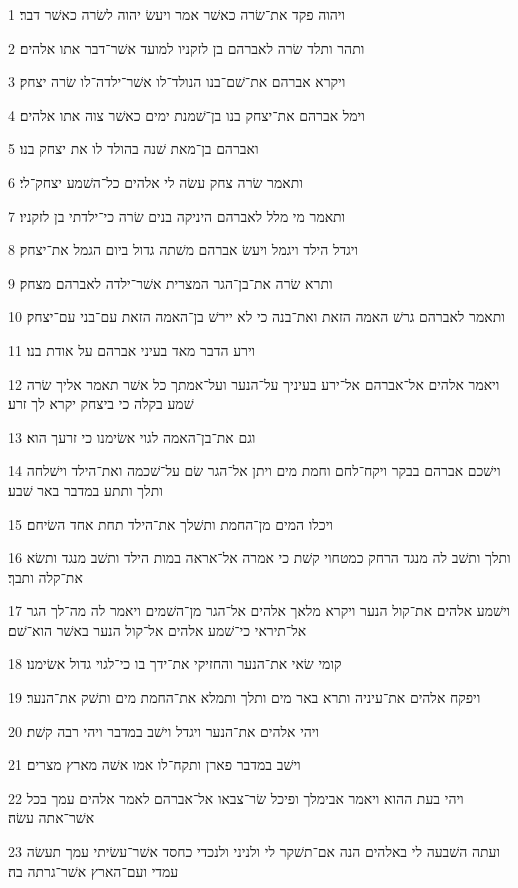 \par 1 ויהוה פקד את־שׂרה כאשׁר אמר ויעשׂ יהוה לשׂרה כאשׁר דבר׃
\par 2 ותהר ותלד שׂרה לאברהם בן לזקניו למועד אשׁר־דבר אתו אלהים׃
\par 3 ויקרא אברהם את־שׁם־בנו הנולד־לו אשׁר־ילדה־לו שׂרה יצחק׃
\par 4 וימל אברהם את־יצחק בנו בן־שׁמנת ימים כאשׁר צוה אתו אלהים׃
\par 5 ואברהם בן־מאת שׁנה בהולד לו את יצחק בנו׃
\par 6 ותאמר שׂרה צחק עשׂה לי אלהים כל־השׁמע יצחק־לי׃
\par 7 ותאמר מי מלל לאברהם היניקה בנים שׂרה כי־ילדתי בן לזקניו׃
\par 8 ויגדל הילד ויגמל ויעשׂ אברהם משׁתה גדול ביום הגמל את־יצחק׃
\par 9 ותרא שׂרה את־בן־הגר המצרית אשׁר־ילדה לאברהם מצחק׃
\par 10 ותאמר לאברהם גרשׁ האמה הזאת ואת־בנה כי לא יירשׁ בן־האמה הזאת עם־בני עם־יצחק׃
\par 11 וירע הדבר מאד בעיני אברהם על אודת בנו׃
\par 12 ויאמר אלהים אל־אברהם אל־ירע בעיניך על־הנער ועל־אמתך כל אשׁר תאמר אליך שׂרה שׁמע בקלה כי ביצחק יקרא לך זרע׃
\par 13 וגם את־בן־האמה לגוי אשׂימנו כי זרעך הוא׃
\par 14 וישׁכם אברהם בבקר ויקח־לחם וחמת מים ויתן אל־הגר שׂם על־שׁכמה ואת־הילד וישׁלחה ותלך ותתע במדבר באר שׁבע׃
\par 15 ויכלו המים מן־החמת ותשׁלך את־הילד תחת אחד השׂיחם׃
\par 16 ותלך ותשׁב לה מנגד הרחק כמטחוי קשׁת כי אמרה אל־אראה במות הילד ותשׁב מנגד ותשׂא את־קלה ותבך׃
\par 17 וישׁמע אלהים את־קול הנער ויקרא מלאך אלהים אל־הגר מן־השׁמים ויאמר לה מה־לך הגר אל־תיראי כי־שׁמע אלהים אל־קול הנער באשׁר הוא־שׁם׃
\par 18 קומי שׂאי את־הנער והחזיקי את־ידך בו כי־לגוי גדול אשׂימנו׃
\par 19 ויפקח אלהים את־עיניה ותרא באר מים ותלך ותמלא את־החמת מים ותשׁק את־הנער׃
\par 20 ויהי אלהים את־הנער ויגדל וישׁב במדבר ויהי רבה קשׁת׃
\par 21 וישׁב במדבר פארן ותקח־לו אמו אשׁה מארץ מצרים׃
\par 22 ויהי בעת ההוא ויאמר אבימלך ופיכל שׂר־צבאו אל־אברהם לאמר אלהים עמך בכל אשׁר־אתה עשׂה׃
\par 23 ועתה השׁבעה לי באלהים הנה אם־תשׁקר לי ולניני ולנכדי כחסד אשׁר־עשׂיתי עמך תעשׂה עמדי ועם־הארץ אשׁר־גרתה בה׃
